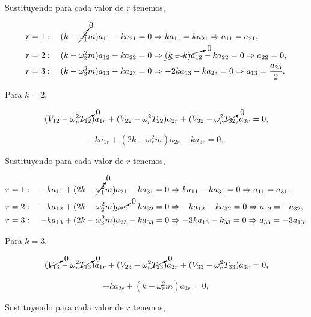 \documentclass[a4paper,10pt]{article}
\numberwithin{equation}{section}
\begin{document}
Sustituyendo para cada valor de $r$ tenemos,

\begin{align}
 r &= 1: \quad (k - \cancelto{0}{\omega_1^2}m)a_{11} - k a_{21} = 0 \Rightarrow 
 ka_{11} = ka_{21} \Rightarrow a_{11} = a_{21}, \\
 r &= 2: \quad (k - \omega_2^2m)a_{12} - ka_{22} = 0 \Rightarrow 
 \cancelto{0}{(k - k)a_{12}} - k a_{22} = 0 \Rightarrow a_{22} = 0, \\
 r &= 3: \quad (k - \omega_3^2m)a_{13} - ka_{23} = 0 \Rightarrow  
 -2ka_{13} - ka_{23} = 0 \Rightarrow a_{13} = \frac{a_{23}}{2}.
\end{align}

Para $k=2$,

\begin{equation}
 (V_{12} - \omega_r^2 \cancelto{0}{T_{12}})a_{1r} + (V_{22} - \omega_r^2 T_{22})a_{2r} + 
 (V_{32} - \omega_r^2 \cancelto{0}{T_{32}})a_{3r}= 0,
\end{equation}

\begin{equation}
 -ka_{1r} + (2k - \omega_r^2m)a_{2r} - ka_{3r} = 0,
\end{equation}

Sustituyendo para cada valor de $r$ tenemos,

\begin{align}
 r &=1: \quad -ka_{11} + (2k - \cancelto{0}{\omega_1^2}m)a_{21} - ka_{31} = 0 \Rightarrow
 ka_{11} - ka_{31} = 0 \Rightarrow a_{11} = a_{31}, \\
 r &=2: \quad -ka_{12} + (2k - \omega_2^2m)\cancelto{0}{a_{22}} - ka_{32} = 0 \Rightarrow
 -ka_{12} - ka_{32} = 0 \Rightarrow a_{12} = -a_{32},\\
 r &=3: \quad -ka_{13} + (2k - \omega_3^2m)a_{23} - ka_{33} = 0 \Rightarrow 
 -3ka_{13} - k_{33} = 0 \Rightarrow a_{33} = -3a_{13}.
\end{align}

Para $k=3$, 

\begin{equation}
 (\cancelto{0}{V_{13}} - \omega_r^2\cancelto{0}{T_{13}})a_{1r} +  (V_{23} - \omega_r^2\cancelto{0}{T_{23}})a_{2r} 
 +  (V_{33} - \omega_r^2T_{33})a_{3r} = 0,
\end{equation}

\begin{equation}
 -ka_{2r} + (k - \omega_r^2m)a_{3r} = 0,
\end{equation}

Sustituyendo para cada valor de $r$ tenemos,
\end{document}
